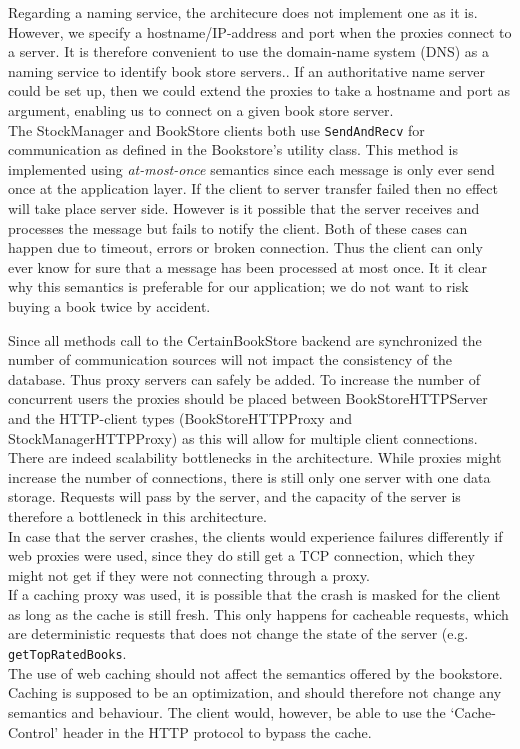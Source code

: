 \documentclass[11pt]{article}
\begin{document}
Regarding a naming service, the architecure does not implement one as it is.
However, we specify a hostname/IP-address and port when the proxies connect
to a server. It is therefore convenient to use the domain-name system
(DNS) as a naming service to identify book store servers.. If an authoritative
name server could be set up, then we could extend the proxies to take a
hostname and port as argument, enabling us to connect on a given book store
server.\\


The StockManager and BookStore clients both use \texttt{SendAndRecv} for communication as defined in the Bookstore’s utility class. This method is implemented using \emph{at-most-once} semantics since each message is only ever send once at the application layer. If the client to server transfer failed then no effect will take place server side. However is it possible that the server receives and processes the message but fails to notify the client. Both of these cases can happen due to timeout, errors or broken connection. Thus the client can only ever know for sure that a message has been processed at most once. It it
clear why this semantics is preferable for our application; we do not want to risk buying
a book twice by accident.



Since all methods call to the CertainBookStore backend are synchronized the number of communication sources will not impact the consistency of the database. Thus proxy servers can safely be added. To increase the number of concurrent users the proxies should be placed between BookStoreHTTPServer and the HTTP-client types (BookStoreHTTPProxy and StockManagerHTTPProxy) as this will allow for multiple client connections.\\


There are indeed scalability bottlenecks in the architecture. While proxies might increase the number of connections, there is still only one server with one data storage. Requests will pass by the server, and the capacity of the server is therefore a bottleneck in this architecture.\\


In case that the server crashes, the clients would experience failures differently if web proxies were used, since they do still get a TCP connection, which they might not get if they were not connecting through a proxy.\\

If a caching proxy was used, it is possible that the crash is masked for the client as long as the cache is still fresh. This only happens for cacheable requests, which are deterministic requests that does not change the state of the server (e.g. \texttt{getTopRatedBooks}.\\

The use of web caching should not affect the semantics offered by the bookstore. Caching is supposed to be an optimization, and should therefore not change any semantics and behaviour. The client would, however, be able to use the ‘Cache-Control’ header in the HTTP protocol to bypass the cache.\\
\end{document}
